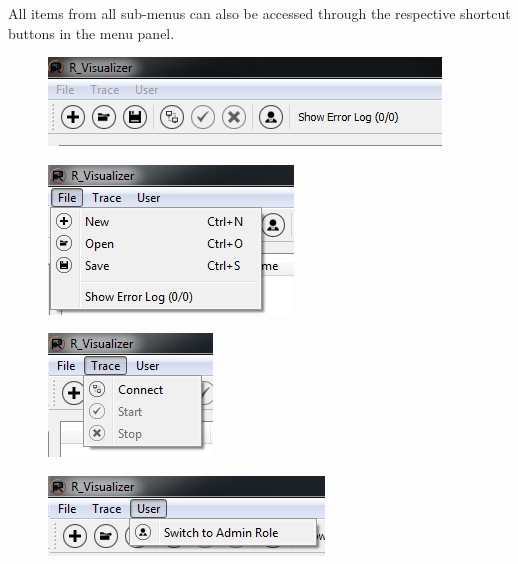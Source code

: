 \documentclass[12pt,a4paper]{scrartcl}
\begin{document}
All items from all sub-menus can also be accessed through the respective shortcut buttons in the menu panel.

\begin{figure}
	\centering
	\includegraphics[width=0.7\linewidth,keepaspectratio]{Graphics/Menu}
	\caption[Menu]{}
	\label{fig:menu}
\end{figure}
\begin{figure}
\centering
\includegraphics[width=0.55\linewidth,keepaspectratio]{Graphics/MenuFile}
\caption[File Menu]{}
\label{fig:menuFile}
\end{figure}
\begin{figure}
\centering
\includegraphics[width=0.5\linewidth,keepaspectratio]{Graphics/MenuTrace}
\caption[Trace Menu]{}
\label{fig:menuTrace}
\end{figure}
\begin{figure}
\centering
\includegraphics[width=0.6\linewidth,keepaspectratio]{Graphics/MenuUser}
\caption[User Menu]{}
\label{fig:menuUser}
\end{figure}
\end{document}
